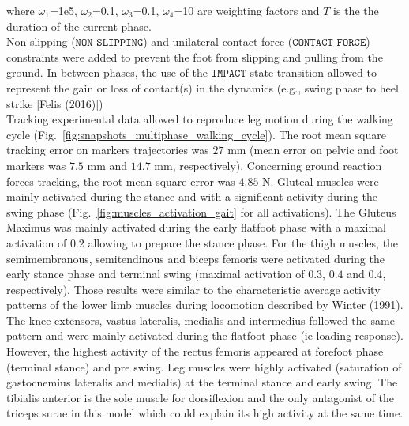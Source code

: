\noindent where $\omega_1$=1e5, $\omega_2$=0.1, $\omega_3$=0.1, $\omega_4$=10 are  weighting factors and $T$ is the the duration of the current phase.\\

Non-slipping ($\mathtt{NON\_SLIPPING}$) and unilateral contact force ($\mathtt{CONTACT\_FORCE}$) constraints were added to prevent the foot from slipping and pulling from the ground. 
In between phases, the use of the $\mathtt{IMPACT}$ state transition allowed to represent the gain or loss of contact(s) in the dynamics (e.g., swing phase to heel strike [Felis (2016)]) \\

Tracking experimental data allowed to reproduce leg motion during the walking cycle (Fig.~\ref{fig:snapshots_multiphase_walking_cycle}). 
The root mean square tracking error on markers trajectories was $27$ mm (mean error on pelvic and foot markers was $7.5$ mm and $14.7$ mm, respectively). 
Concerning ground reaction forces tracking, the root mean square error was $4.85$ N.
Gluteal muscles were mainly activated during the stance and with a significant activity during the swing phase (Fig.~\ref{fig:muscles_activation_gait} for all activations). 
The Gluteus Maximus was mainly activated during the early flatfoot phase with a maximal activation of $0.2$ allowing to prepare the stance phase. 
For the thigh muscles, the semimembranous, semitendinous and biceps femoris were activated during the early stance phase and terminal swing (maximal activation of $0.3$, $0.4$ and $0.4$, respectively). 
Those results were similar to the characteristic average activity patterns of the lower limb muscles during locomotion described by Winter (1991). 
The knee extensors, vastus lateralis, medialis and intermedius followed the same pattern and were mainly activated during the flatfoot phase (ie loading response).
However, the highest activity of the rectus femoris appeared at forefoot phase (terminal stance) and pre swing.
Leg muscles were highly activated (saturation of gastocnemius lateralis and medialis) at the terminal stance and early swing. The tibialis anterior is the sole muscle for dorsiflexion and the only antagonist of the triceps surae in this model which could explain its high activity at the same time. 

